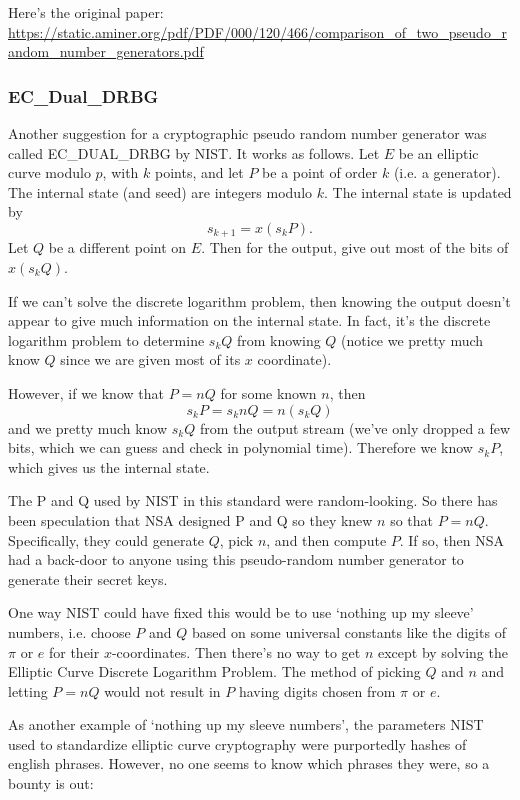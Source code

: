 \documentclass{article}
\theoremstyle{plain}
\theoremstyle{definition}
\theoremstyle{remark}
\numberwithin{theorem}{section}
\begin{document}
Here's the original paper:
\url{https://static.aminer.org/pdf/PDF/000/120/466/comparison_of_two_pseudo_random_number_generators.pdf}

\subsubsection{EC\_Dual\_DRBG}

Another suggestion for a cryptographic pseudo random number generator was called EC\_DUAL\_DRBG by NIST.  It works as follows.  Let $E$ be an elliptic curve modulo $p$, with $k$ points, and let $P$ be a point of order $k$ (i.e. a generator).  
The internal state (and seed) are integers modulo $k$.  The internal state is updated by
\[
s_{k+1} = x(s_k P).
\]
Let $Q$ be a different point on $E$.  Then for the output, give out most of the bits of $x(s_k Q)$.

If we can't solve the discrete logarithm problem, then knowing the output doesn't appear to give much information on the internal state.  In fact, it's the discrete logarithm problem to determine $s_kQ$ from knowing $Q$ (notice we pretty much know $Q$ since we are given most of its $x$ coordinate).

However, if we know that $P = nQ$ for some known $n$, then 
\[
s_k P = s_k n Q = n (s_k Q)
\]
and we pretty much know $s_k Q$ from the output stream (we've only dropped a few bits, which we can guess and check in polynomial time).  Therefore we know $s_kP$, which gives us the internal state.

The P and Q used by NIST in this standard were random-looking.  So there has been speculation that NSA designed P and Q so they knew $n$ so that $P = nQ$.  Specifically, they could generate $Q$, pick $n$, and then compute $P$.  If so, then NSA had a back-door to anyone using this pseudo-random number generator to generate their secret keys.

One way NIST could have fixed this would be to use `nothing up my sleeve' numbers, i.e. choose $P$ and $Q$ based on some universal constants like the digits of $\pi$ or $e$ for their $x$-coordinates.  Then there's no way to get $n$ except by solving the Elliptic Curve Discrete Logarithm Problem.  The method of picking $Q$ and $n$ and letting $P = nQ$ would not result in $P$ having digits chosen from $\pi$ or $e$.

As another example of `nothing up my sleeve numbers', the parameters NIST used to standardize elliptic curve cryptography were purportedly hashes of english phrases.  However, no one seems to know which phrases they were, so a bounty is out:
\end{document}
